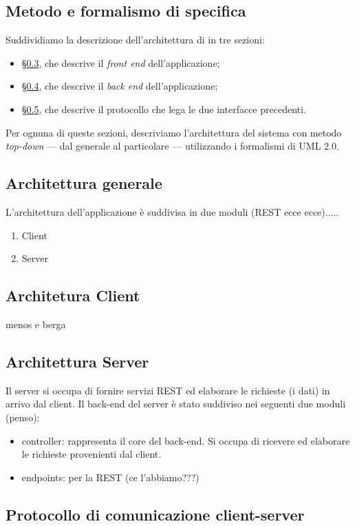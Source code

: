 
\subsection{Metodo e formalismo di specifica}
Suddividiamo la descrizione dell'architettura di \proj{} in tre sezioni:
\begin{itemize}
	\item §\ref{sec:arch_client}, che descrive il \emph{front end} dell'applicazione;
	\item §\ref{sec:arch_server}, che descrive il \emph{back end} dell'applicazione;
	\item §\ref{sec:arch_proto}, che descrive il protocollo che lega le due interfacce precedenti.
\end{itemize}
Per ognuna di queste sezioni, descriviamo l'architettura del sistema con metodo \emph{top-down} --- dal generale al particolare --- utilizzando i formalismi di UML 2.0.

\subsection{Architettura generale}
L'architettura dell'applicazione è suddivisa in due moduli (REST ecce ecce).....
\begin{enumerate}
	\item Client
	\item Server
\end{enumerate}

\subsection{Architetura Client} \label{sec:arch_client}
menos e berga

\subsection{Architettura Server} \label{sec:arch_server}
Il server si occupa di fornire servizi REST ed elaborare le richieste (i dati) in arrivo dal client. Il back-end del server è stato suddiviso nei seguenti due moduli (penso):
\begin{itemize}
	\item controller: rappresenta il core del back-end. Si occupa di ricevere ed elaborare le richieste provenienti dal client.
	\item endpoints: per la REST (ce l'abbiamo???)
\end{itemize}

\subsection{Protocollo di comunicazione client-server} \label{sec:arch_proto}
